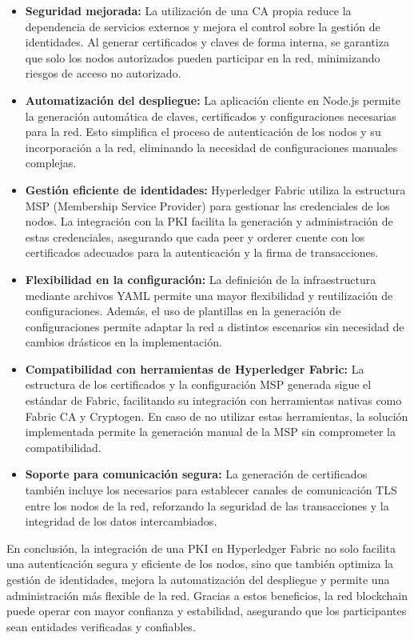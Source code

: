 \begin{itemize}
    \item \textbf{Seguridad mejorada:} La utilización de una CA propia reduce la dependencia de servicios externos y mejora el control sobre la gestión de identidades. Al generar certificados y claves de forma interna, se garantiza que solo los nodos autorizados pueden participar en la red, minimizando riesgos de acceso no autorizado.
    
    \item \textbf{Automatización del despliegue:} La aplicación cliente en Node.js permite la generación automática de claves, certificados y configuraciones necesarias para la red. Esto simplifica el proceso de autenticación de los nodos y su incorporación a la red, eliminando la necesidad de configuraciones manuales complejas.
    
    \item \textbf{Gestión eficiente de identidades:} Hyperledger Fabric utiliza la estructura MSP (Membership Service Provider) para gestionar las credenciales de los nodos. La integración con la PKI facilita la generación y administración de estas credenciales, asegurando que cada peer y orderer cuente con los certificados adecuados para la autenticación y la firma de transacciones.
    
    \item \textbf{Flexibilidad en la configuración:} La definición de la infraestructura mediante archivos YAML permite una mayor flexibilidad y reutilización de configuraciones. Además, el uso de plantillas en la generación de configuraciones permite adaptar la red a distintos escenarios sin necesidad de cambios drásticos en la implementación.
    
    \item \textbf{Compatibilidad con herramientas de Hyperledger Fabric:} La estructura de los certificados y la configuración MSP generada sigue el estándar de Fabric, facilitando su integración con herramientas nativas como Fabric CA y Cryptogen. En caso de no utilizar estas herramientas, la solución implementada permite la generación manual de la MSP sin comprometer la compatibilidad.
    
    \item \textbf{Soporte para comunicación segura:} La generación de certificados también incluye los necesarios para establecer canales de comunicación TLS entre los nodos de la red, reforzando la seguridad de las transacciones y la integridad de los datos intercambiados.
\end{itemize}

En conclusión, la integración de una PKI en Hyperledger Fabric no solo facilita una autenticación segura y eficiente de los nodos, sino que también optimiza la gestión de identidades, mejora la automatización del despliegue y permite una administración más flexible de la red. Gracias a estos beneficios, la red blockchain puede operar con mayor confianza y estabilidad, asegurando que los participantes sean entidades verificadas y confiables.
